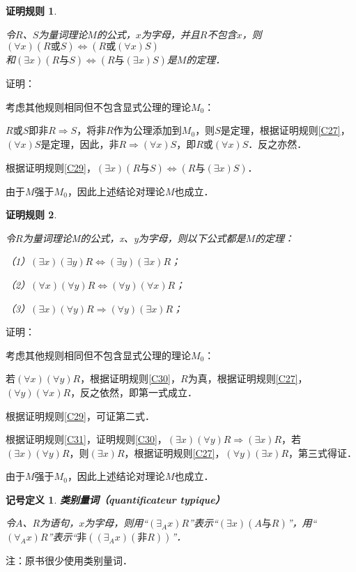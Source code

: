 \documentclass[12pt, a4paper, oneside]{book}
\newtheorem{sign}{记号定义}
\newtheorem{C}{证明规则}
\begin{document}
			\begin{C}\label{C33}
				\hfill\par
				令$R$、$S$为量词理论$M$的公式，$x$为字母，并且$R$不包含$x$，则$(\forall x)(R\text{或}S)\Leftrightarrow (R\text{或}(\forall x)S)$\\和$(\exists x)(R\text{与}S)\Leftrightarrow (R\text{与}(\exists x)S)$是$M$的定理．
			\end{C}
			证明：
			\par
			考虑其他规则相同但不包含显式公理的理论$M_0$：
			\par
			$R\text{或}S$即$\text{非}R\Rightarrow S$，将$\text{非}R$作为公理添加到$M_0$，则$S$是定理，根据证明规则\ref{C27}，$(\forall x)S$是定理，因此，$\text{非}R\Rightarrow (\forall x)S$，即$R\text{或}(\forall x)S$．反之亦然．
			\par
			根据证明规则\ref{C29}，$(\exists x)(R\text{与}S)\Leftrightarrow (R\text{与}(\exists x)S)$．
			\par
			由于$M$强于$M_0$，因此上述结论对理论$M$也成立．

			\begin{C}\label{C34}
				\hfill\par
				令$R$为量词理论M的公式，x、y为字母，则以下公式都是$M$的定理：
				\par
				（1）$(\exists x)(\exists y)R\Leftrightarrow (\exists y)(\exists x)R$；
				\par
				（2）$(\forall x)(\forall y)R\Leftrightarrow (\forall y)(\forall x)R$；
				\par
				（3）$(\exists x)(\forall y)R\Rightarrow (\forall y)(\exists x)R$；
			\end{C}
			证明：
			\par
			考虑其他规则相同但不包含显式公理的理论$M_0$：
			\par
			若$(\forall x)(\forall y)R$，根据证明规则\ref{C30}，$R$为真，根据证明规则\ref{C27}，$(\forall y)(\forall x)R$，反之依然，即第一式成立．
			\par
			根据证明规则\ref{C29}，可证第二式．
			\par
			根据证明规则\ref{C31}，证明规则\ref{C30}，$(\exists x)(\forall y)R\Rightarrow (\exists x)R$，若$(\exists x)(\forall y)R$，则$(\exists x)R$，根据证明规则\ref{C27}，$(\forall y)(\exists x)R$，第三式得证．
			\par
			由于$M$强于$M_0$，因此上述结论对理论$M$也成立．

			\begin{sign}
				\textbf{类别量词（quantificateur typique）}
				\par
				令$A$、$R$为语句，$x$为字母，则用“$(\exists_Ax)R$”表示“$(\exists x)(A\text{与}R)$”，用“$(\forall_Ax)R$”表示“$\text{非}((\exists_Ax)(\text{非}R))$”．
			\end{sign}
			注：原书很少使用类别量词．
			
\end{document}
